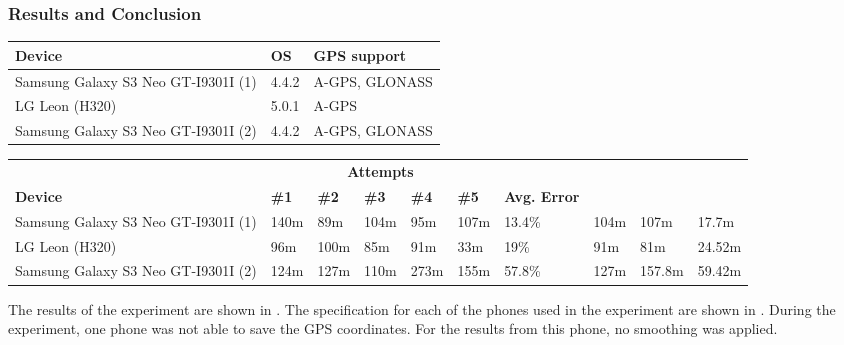 \subsubsection{Results and Conclusion}
%
\begin{table}
	\centering
	\begingroup
	\fontsize{10pt}{10pt}\selectfont
	\begin{tabular}{@{}lll@{}}
		\toprule
		\textbf{Device} & \textbf{OS}  & \textbf{GPS support} \\ \midrule
		Samsung Galaxy S3 Neo GT-I9301I (1) & 4.4.2 & A-GPS, GLONASS \\
		LG Leon (H320) & 5.0.1 & A-GPS\\
		Samsung Galaxy S3 Neo GT-I9301I (2) & 4.4.2 & A-GPS, GLONASS\\ \bottomrule
	\end{tabular}
	\label{2MWT: exp1 specs}
	\endgroup
\end{table}
%
\begin{table}
	\centering
	\begingroup
		\fontsize{6pt}{7pt}\selectfont
		\begin{tabular}{@{}llllllllll@{}}
			\toprule
			 &  \multicolumn{5}{c}{\textbf{Attempts}}  &  \\ 
			\cline{2-6}
			\textbf{Device}&	\textbf{\#1} & \textbf{\#2} & \textbf{\#3} & \textbf{\#4} & \textbf{\#5} & \textbf{Avg. Error} & \bm{$\tilde{x}$} &  \bm{$\mu$} & \bm{$\sigma$} \\
			\midrule
			Samsung Galaxy S3 Neo GT-I9301I (1) & 140m & 89m & 104m & 95m & 107m & 13.4\% & 104m & 107m & 17.7m\\
			LG Leon (H320) & 96m & 100m & 85m & 91m & 33m & 19\% & 91m & 81m & 24.52m \\
			Samsung Galaxy S3 Neo GT-I9301I (2) & 124m & 127m & 110m & 273m & 155m  & 57.8\% & 127m & 157.8m & 59.42m\\ \bottomrule
		\end{tabular}
		\label{table:walktestresults}
	\endgroup
\end{table}
%
The results of the experiment are shown in . The specification for each of the phones used in the experiment are shown in .
During the experiment, one phone was not able to save the GPS coordinates.
For the results from this phone, no smoothing was applied.
